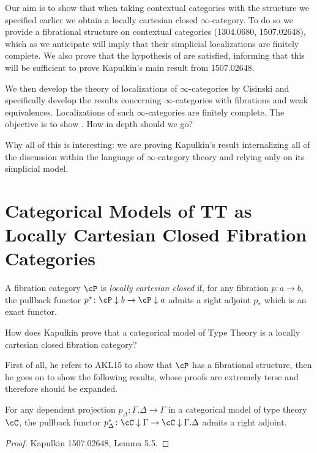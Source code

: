 \documentclass[a4paper,12pt]{scrartcl}
\begin{document}
Our aim is to show that when taking contextual categories with the structure we
specified earlier we obtain a locally cartesian closed $\infty$-category. To do
so we provide a fibrational structure on contextual categories (1304.0680,
1507.02648), which as we anticipate will imply that their simplicial
localizations are finitely complete. We also prove that the hypothesis of
\cite[Thm.\ 7.6.16]{Cis19} are satisfied, informing that this will be sufficient
to prove Kapulkin's main result from 1507.02648.

We then develop the theory of localizations of $\infty$-categories by Cisinski
and specifically develop the results concerning $\infty$-categories with
fibrations and weak equivalences. Localizations of such $\infty$-categories are
finitely complete. The objective is to show \cite[Thm.\ 7.6.16]{Cis19}. How in
depth should we go?

Why all of this is interesting: we are proving Kapulkin's result internalizing
all of the discussion within the language of $\infty$-category theory and
relying only on its simplicial model.

\section{Categorical Models of TT as Locally Cartesian Closed Fibration
Categories}

\begin{defn}
  A fibration category $\cP$ is \emph{locally cartesian closed} if, for any
  fibration $p\colon a\rightarrow b$, the pullback functor
  $p^*\colon\cP\downarrow b\rightarrow\cP\downarrow a$ admits a right adjoint
  $p_*$ which is an exact functor.
\end{defn}

How does Kapulkin prove that a categorical model of Type Theory is a locally
cartesian closed fibration category?

First of all, he refers to AKL15 to show that $\cP$ has a fibrational structure,
then he goes on to show the following results, whose proofs are extremely terse
and therefore should be expanded.

\begin{lem}
  For any dependent projection $p_\Delta\colon\Gamma.\Delta\rightarrow\Gamma$ in
  a categorical model of type theory $\cC$, the pullback functor
  $p_\Delta^*\colon\cC\downarrow\Gamma\rightarrow\cC\downarrow\Gamma.\Delta$
  admits a right adjoint.
\end{lem}
\begin{proof}
  Kapulkin 1507.02648, Lemma 5.5.
\end{proof}
\end{document}
